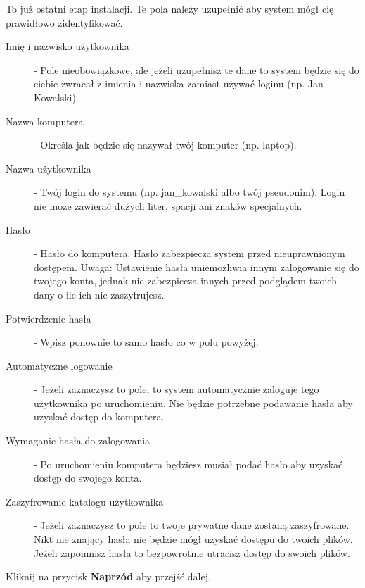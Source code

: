 To już ostatni etap instalacji. Te pola należy uzupełnić aby system mógł cię prawidłowo zidentyfikować.
\begin{description}
\item[Imię i nazwisko użytkownika] - Pole nieobowiązkowe, ale jeżeli uzupełnisz te dane to system będzie się do ciebie zwracał z imienia i nazwiska zamiast używać loginu (np. Jan Kowalski).
\item[Nazwa komputera] - Określa jak będzie się nazywał twój komputer (np. laptop).
\item[Nazwa użytkownika] - Twój login do systemu (np. jan\_kowalski albo twój pseudonim). Login nie może zawierać dużych liter, spacji ani znaków specjalnych.
\item[Hasło] - Hasło do komputera. Hasło zabezpiecza system przed nieuprawnionym dostępem. Uwaga: Ustawienie hasła uniemożliwia innym zalogowanie się do twojego konta, jednak nie zabezpiecza innych przed podglądem twoich dany o ile ich nie zaszyfrujesz. 
\item[Potwierdzenie hasła] - Wpisz ponownie to samo hasło co w polu powyżej.
\item[Automatyczne logowanie] - Jeżeli zaznaczysz to pole, to system automatycznie zaloguje tego użytkownika po uruchomieniu. Nie będzie potrzebne podawanie hasła aby uzyskać dostęp do komputera.
\item[Wymaganie hasła do zalogowania] - Po uruchomieniu komputera będziesz musiał podać hasło aby uzyskać dostęp do swojego konta.
\item[Zaszyfrowanie katalogu użytkownika] - Jeżeli zaznaczysz to pole to twoje prywatne dane zostaną zaszyfrowane. Nikt nie znający hasła nie będzie mógł uzyskać dostępu do twoich plików. Jeżeli zapomnisz hasła to bezpowrotnie utracisz dostęp do swoich plików.
\end{description}

\begin{flushright}
Kliknij na przycisk \textbf{Naprzód} aby przejść dalej.
\end{flushright}
\clearpage

